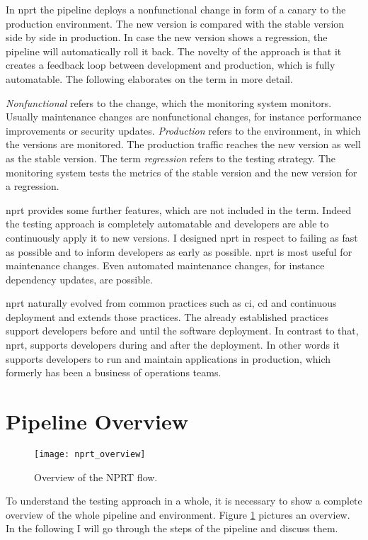 In \gls{nprt} the pipeline deploys a nonfunctional change in form of a canary to the
production environment. The new version is compared with the stable version side by side
in production. In case the new version shows a regression, the pipeline will automatically
roll it back. The novelty of the approach is that it creates a feedback loop between
development and production, which is fully automatable. The following elaborates on the
term in more detail.

\emph{Nonfunctional} refers to the change, which the monitoring system monitors. Usually
maintenance changes are nonfunctional changes, for instance performance improvements or
security updates. \emph{Production} refers to the environment, in which the versions are
monitored. The production traffic reaches the new version as well as the stable
version. The term \emph{regression} refers to the testing strategy. The monitoring system
tests the metrics of the stable version and the new version for a regression.

\gls{nprt} provides some further features, which are not included in the term. Indeed the
testing approach is completely automatable and developers are able to continuously apply
it to new versions. I designed \gls{nprt} in respect to failing as fast as possible and to
inform developers as early as possible. \gls{nprt} is most useful for maintenance
changes. Even automated maintenance changes, for instance dependency updates, are
possible.

\gls{nprt} naturally evolved from common practices such as \gls{ci}, \gls{cd} and
continuous deployment and extends those practices. The already established practices
support developers before and until the software deployment. In contrast to that,
\gls{nprt}, supports developers during and after the deployment. In other words it
supports developers to run and maintain applications in production, which formerly has
been a business of operations teams.

\section{Pipeline Overview}

\begin{figure}[htbp]
  \texttt{[image: nprt\_overview]}
  \caption[nprtflow]{Overview of the NPRT flow.}
  \label{fig:nprt_flow}
\end{figure}

To understand the testing approach in a whole, it is necessary to show a complete overview
of the whole pipeline and environment. Figure \ref{fig:nprt_flow} pictures an overview. In
the following I will go through the steps of the pipeline and discuss them.

